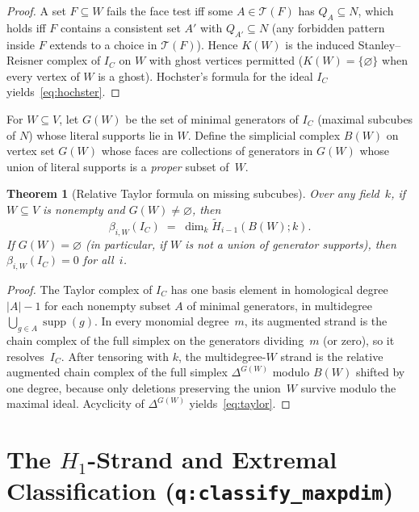 \documentclass[11pt]{article}
\theoremstyle{plain}
\newtheorem{theorem}{Theorem}
\theoremstyle{definition}
\theoremstyle{remark}
\DeclareMathOperator{\supp}{supp}
\begin{document}
\begin{proof}
A set $F \subseteq W$ fails the face test iff some $A \in \mathcal{T}(F)$ has $Q_A \subseteq N$, which holds iff $F$ contains a consistent set $A'$ with $Q_{A'} \subseteq N$ (any forbidden pattern inside $F$ extends to a choice in $\mathcal{T}(F)$). Hence $K(W)$ is the induced Stanley--Reisner complex of $I_C$ on $W$ with ghost vertices permitted ($K(W) = \{\varnothing\}$ when every vertex of $W$ is a ghost). Hochster's formula for the ideal $I_C$ yields~\eqref{eq:hochster}.
\end{proof}

For $W \subseteq V$, let $G(W)$ be the set of minimal generators of $I_C$ (maximal subcubes of $N$) whose literal supports lie in $W$. Define the simplicial complex $B(W)$ on vertex set $G(W)$ whose faces are collections of generators in $G(W)$ whose union of literal supports is a \emph{proper} subset of~$W$.

\begin{theorem}[Relative Taylor formula on missing subcubes]\label{thm:taylor}
Over any field~$k$, if $W \subseteq V$ is nonempty and $G(W) \neq \varnothing$, then
\begin{equation}\label{eq:taylor}
\beta_{i,W}(I_C) \;=\; \dim_k \widetilde{H}_{i-1}(B(W); k).
\end{equation}
If $G(W) = \varnothing$ (in particular, if $W$ is not a union of generator supports), then $\beta_{i,W}(I_C) = 0$ for all~$i$.
\end{theorem}

\begin{proof}
The Taylor complex of $I_C$ has one basis element in homological degree $|A|-1$ for each nonempty subset $A$ of minimal generators, in multidegree $\bigcup_{g\in A}\supp(g)$. In every monomial degree~$m$, its augmented strand is the chain complex of the full simplex on the generators dividing~$m$ (or zero), so it resolves~$I_C$. After tensoring with $k$, the multidegree-$W$ strand is the relative augmented chain complex of the full simplex $\Delta^{G(W)}$ modulo $B(W)$ shifted by one degree, because only deletions preserving the union~$W$ survive modulo the maximal ideal. Acyclicity of $\Delta^{G(W)}$ yields~\eqref{eq:taylor}.
\end{proof}

\section{The \texorpdfstring{$H_1$}{H1}-Strand and Extremal Classification (\texttt{q:classify\_maxpdim})}
\end{document}
